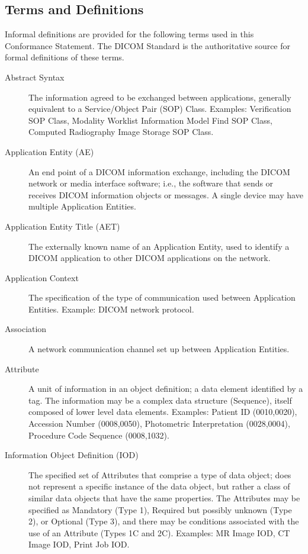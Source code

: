 \documentclass[12pt, letterpaper]{article}
\begin{document}
\subsection{Terms and Definitions}

Informal definitions are provided for the following terms used in this Conformance Statement.
The \gls{DICOM} Standard is the authoritative source for formal definitions of these terms.

\begin{description}

    \item [Abstract Syntax] The information agreed to be exchanged between applications, generally equivalent to a Service/Object Pair (\gls{SOP}) Class.
        Examples: Verification \gls{SOP} Class, Modality Worklist Information Model Find \gls{SOP} Class, Computed Radiography Image Storage \gls{SOP} Class.

    \item [Application Entity (AE)] An end point of a \gls{DICOM} information exchange, including the \gls{DICOM} network or media interface software; i.e., the software that sends or receives \gls{DICOM} information objects or messages.
        A single device may have multiple Application Entities.

    \item [Application Entity Title (AET)] The externally known name of an Application Entity, used to identify a \gls{DICOM} application to other \gls{DICOM} applications on the network. 

    \item [Application Context] The specification of the type of communication used between Application Entities.
        Example: \gls{DICOM} network protocol.

    \item [Association] A network communication channel set up between Application Entities.

    \item [Attribute] A unit of information in an object definition; a data element identified by a tag.
        The information may be a complex data structure (Sequence), itself composed of lower level data elements.
        Examples: Patient ID (0010,0020), Accession Number (0008,0050), Photometric Interpretation (0028,0004), Procedure Code Sequence (0008,1032).

    \item [Information Object Definition (IOD)] The specified set of Attributes that comprise a type of data object; does not represent a specific instance of the data object, but rather a class of similar data objects that have the same properties.
        The Attributes may be specified as Mandatory (Type 1), Required but possibly unknown (Type 2), or Optional (Type 3), and there may be conditions associated with the use of an Attribute (Types 1C and 2C).
        Examples: MR Image \gls{IOD}, CT Image \gls{IOD}, Print Job \gls{IOD}.\@


\end{description}
\end{document}
